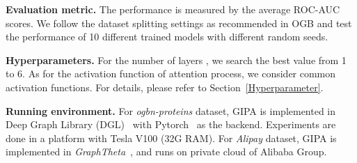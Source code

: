 \documentclass[runningheads]{llncs}
\newcommand{\model}{GIPA\xspace}
\begin{document}
\noindent \textbf{Evaluation metric.} The performance is measured by the average ROC-AUC scores. We follow the dataset splitting settings as recommended in OGB and test the performance of 10 different trained models with different random seeds. 

\noindent \textbf{Hyperparameters.} For the number of layers , we search the best value from 1 to 6. As for the activation function of attention process, we consider common activation functions. For details, please refer to Section~\ref{Hyperparameter}.


\noindent \textbf{Running environment.} For \textit{ogbn-proteins} dataset, \model is implemented in Deep Graph Library (DGL)~\cite{wang2019deep} with Pytorch~\cite{paszke2019pytorch} as the backend. Experiments are done in a platform with Tesla V100 (32G RAM). For \textit{Alipay} dataset, \model is implemented in \textit{GraphTheta}~\cite{graphtheta}, and runs on private cloud of Alibaba Group.
\end{document}
